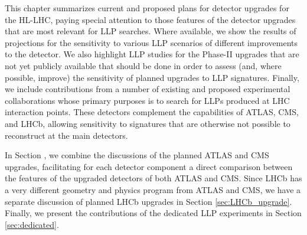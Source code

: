 This chapter summarizes current and proposed plans for detector upgrades for the HL-LHC, paying special attention to those features of the detector upgrades that are most relevant for LLP searches. Where available, we show the results of projections for the sensitivity to various LLP scenarios of different improvements to the detector. We also highlight LLP studies for the Phase-II upgrades that are not yet publicly available that should be done in order to assess (and, where possible, improve) the sensitivity of planned upgrades to LLP signatures. Finally, we include contributions from a number of existing and proposed experimental collaborations whose primary purposes is to search for LLPs produced at LHC interaction points. These detectors complement the capabilities of ATLAS, CMS, and LHCb, allowing sensitivity to signatures that are otherwise not possible to reconstruct at the main detectors.

In Section \label{sec:upgradelhc}, we combine the discussions of the planned ATLAS and CMS upgrades, facilitating for each detector component a direct comparison between the features of the upgraded detectors of both ATLAS and CMS. Since LHCb has a very different geometry and physics program from ATLAS and CMS, we have a separate discussion of planned LHCb upgrades in Section \ref{sec:LHCb_upgrade}. Finally, we present the contributions of the dedicated LLP experiments in Section \ref{sec:dedicated}.





